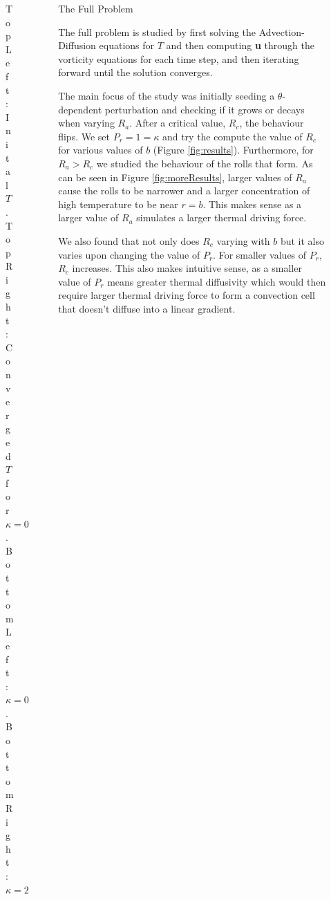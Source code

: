 \documentclass[final]{beamer}
\newlength{\sepwid}
\newlength{\onecolwid}
\newlength{\twocolwid}
\begin{document}
\begin{frame}[t]
\begin{columns}[t]
\begin{column}{\twocolwid}
\begin{columns}[t,totalwidth=\twocolwid]
\begin{column}{\onecolwid}
\begin{figure}
\caption{\footnotesize Top Left: Inital $T$. Top Right: Converged $T$ for $\kappa = 0.001$. BottomLeft: $\kappa = 0.1$. BottomRight: $\kappa = 2$}
\label{fig:kappa}
\end{figure}

\end{column} %

\end{columns} %

\end{column} %
\begin{column}{\sepwid}\end{column} %

\begin{column}{\onecolwid} %


\begin{block}{The Full Problem}
{\small
The full problem is studied by first solving the Advection-Diffusion equations for $T$ and then computing \textbf{u} through the vorticity equations for each time step, and then iterating forward until the solution converges. 

The main focus of the study was initially seeding a $\theta$-dependent perturbation and checking if it grows or decays when varying $R_a$. After a critical value, $R_c$, the behaviour flips. We set $P_r = 1 = \kappa$ and try the compute the value of $R_c$ for various values of $b$ (Figure \ref{fig:results}). Furthermore, for $R_a > R_c$ we studied the behaviour of the rolls that form. As can be seen in Figure \ref{fig:moreResults}, larger values of $R_a$ cause the rolls to be narrower and a larger concentration of high temperature to be near $r=b$. This makes sense as a larger value of $R_a$ simulates a larger thermal driving force.

We also found that not only does $R_c$ varying with $b$ but it also varies upon changing the value of $P_r$. For smaller values of $P_r$, $R_c$ increases. This also makes intuitive sense, as a smaller value of $P_r$ means greater thermal diffusivity which would then require larger thermal driving force to form a convection cell that doesn't diffuse into a linear gradient.
}
\end{block}


\end{column}
\end{columns}
\end{frame}
\end{document}
